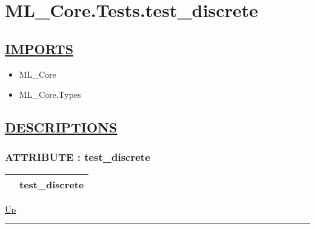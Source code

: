 \chapter*{ML\_Core.Tests.test\_discrete}
\hypertarget{ecldoc:toc:ML_Core.Tests.test_discrete}{}

\section*{\underline{IMPORTS}}
\begin{itemize}
\item ML\_Core
\item ML\_Core.Types
\end{itemize}

\section*{\underline{DESCRIPTIONS}}
\subsection*{ATTRIBUTE : test\_discrete}
\hypertarget{ecldoc:ml_core.tests.test_discrete}{}

{\renewcommand{\arraystretch}{1.5}
\begin{tabularx}{\textwidth}{|>{\raggedright\arraybackslash}l|X|}
\hline
\hspace{0pt} & test\_discrete \\
\hline
\end{tabularx}
}

\hyperlink{ecldoc:toc:ML_Core/Tests}{Up}

\par


\rule{\textwidth}{0.4pt}
